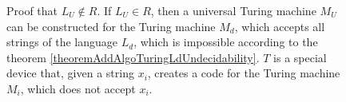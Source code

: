 \begin{figure}
\centering



\caption{Proof that $L_U \notin R$. 
  If $L_U \in R$, then a universal Turing machine $M_U$ can be
  constructed for the Turing machine $M_d$, which accepts all strings
  of the language $L_d$, which is impossible according to the theorem 
  \ref {theoremAddAlgoTuringLdUndecidability}. $T$ is a special
  device that, given a string $x_i$, creates a code for the Turing machine
  $M_i$, which does not accept $x_i$.}
\label{figAddAlgoUTuringProof}
\end{figure}